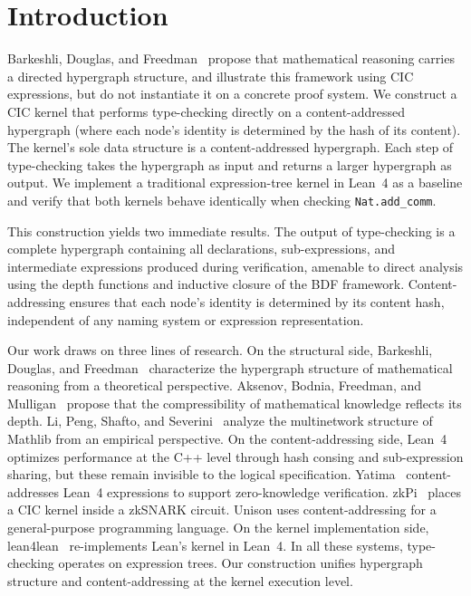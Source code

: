 \section{Introduction}\label{sec:introduction}

Barkeshli, Douglas, and Freedman~\cite{BDF2026} propose that mathematical reasoning carries a directed hypergraph structure, and illustrate this framework using CIC expressions, but do not instantiate it on a concrete proof system.  We construct a CIC kernel that performs type-checking directly on a content-addressed hypergraph (where each node's identity is determined by the hash of its content).  The kernel's sole data structure is a content-addressed hypergraph.  Each step of type-checking takes the hypergraph as input and returns a larger hypergraph as output.  We implement a traditional expression-tree kernel in Lean~4 as a baseline and verify that both kernels behave identically when checking \texttt{Nat.add\_comm}.

This construction yields two immediate results.  The output of type-checking is a complete hypergraph containing all declarations, sub-expressions, and intermediate expressions produced during verification, amenable to direct analysis using the depth functions and inductive closure of the BDF framework.  Content-addressing ensures that each node's identity is determined by its content hash, independent of any naming system or expression representation.

Our work draws on three lines of research.  On the structural side, Barkeshli, Douglas, and Freedman~\cite{BDF2026} characterize the hypergraph structure of mathematical reasoning from a theoretical perspective.  Aksenov, Bodnia, Freedman, and Mulligan~\cite{Aksenov2026} propose that the compressibility of mathematical knowledge reflects its depth.  Li, Peng, Shafto, and Severini~\cite{LPSS26b} analyze the multinetwork structure of Mathlib from an empirical perspective.  On the content-addressing side, Lean~4 optimizes performance at the C++ level through hash consing and sub-expression sharing, but these remain invisible to the logical specification.  Yatima~\cite{Arg23} content-addresses Lean~4 expressions to support zero-knowledge verification.  zkPi~\cite{zkPi} places a CIC kernel inside a zkSNARK circuit.  Unison uses content-addressing for a general-purpose programming language.  On the kernel implementation side, lean4lean~\cite{lean4lean} re-implements Lean's kernel in Lean~4.  In all these systems, type-checking operates on expression trees.  Our construction unifies hypergraph structure and content-addressing at the kernel execution level.
